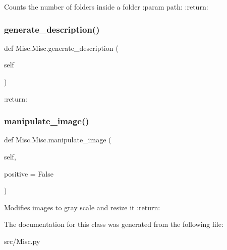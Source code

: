 \begin{DoxyVerb}Counts the number of folders inside a folder
:param path:
:return:
\end{DoxyVerb}
 \mbox{\label{class_misc_1_1_misc_a850d818bacc25df0ecc2ae05b9b15f89}} 
\subsubsection{\texorpdfstring{generate\+\_\+description()}{generate\_description()}}
{\footnotesize\ttfamily def Misc.\+Misc.\+generate\+\_\+description (\begin{DoxyParamCaption}\item[{}]{self }\end{DoxyParamCaption})}

\begin{DoxyVerb}:return:
\end{DoxyVerb}
 \mbox{\label{class_misc_1_1_misc_aebc81e32ad0507ccbccd8173d9a0ff50}} 
\subsubsection{\texorpdfstring{manipulate\+\_\+image()}{manipulate\_image()}}
{\footnotesize\ttfamily def Misc.\+Misc.\+manipulate\+\_\+image (\begin{DoxyParamCaption}\item[{}]{self,  }\item[{}]{positive = {\ttfamily False} }\end{DoxyParamCaption})}

\begin{DoxyVerb}Modifies images to gray scale and resize it
:return:
\end{DoxyVerb}
 

The documentation for this class was generated from the following file\+:\begin{DoxyCompactItemize}
\item 
src/Misc.\+py\end{DoxyCompactItemize}
